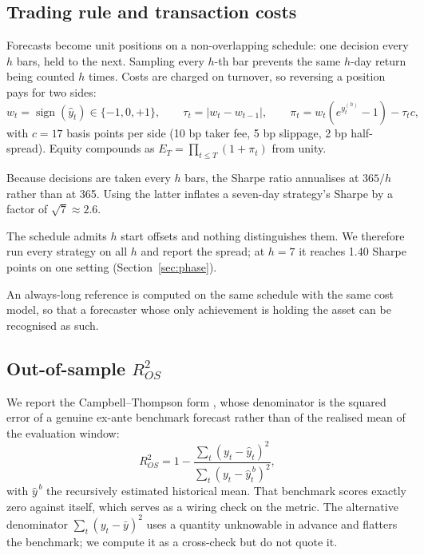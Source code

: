 \documentclass{article}
\theoremstyle{plain}
\theoremstyle{definition}
\newcommand{\rsq}{R^2_{OS}}
\begin{document}
\subsection{Trading rule and transaction costs}
\label{sec:strategy}

Forecasts become unit positions on a non-overlapping schedule: one decision every
$h$ bars, held to the next. Sampling every $h$-th bar prevents the same $h$-day
return being counted $h$ times. Costs are charged on turnover, so reversing a
position pays for two sides:
%
\begin{equation}
  w_t = \operatorname{sign}(\hat{y}_t) \in \{-1, 0, +1\},
  \qquad
  \tau_t = |w_t - w_{t-1}|,
  \qquad
  \pi_t = w_t\!\left(e^{y_t^{(h)}} - 1\right) - \tau_t c,
\end{equation}
%
with $c = 17$ basis points per side (10 bp taker fee, 5 bp slippage, 2 bp
half-spread). Equity compounds as $E_T = \prod_{t \le T}(1 + \pi_t)$ from unity.

Because decisions are taken every $h$ bars, the Sharpe ratio annualises at $365/h$
rather than at 365. Using the latter inflates a seven-day strategy's Sharpe by a
factor of $\sqrt{7} \approx 2.6$.

The schedule admits $h$ start offsets and nothing distinguishes them. We therefore
run every strategy on all $h$ and report the spread; at $h=7$ it reaches 1.40
Sharpe points on one setting (Section~\ref{sec:phase}).

An always-long reference is computed on the same schedule with the same cost
model, so that a forecaster whose only achievement is holding the asset can be
recognised as such.

\subsection{Out-of-sample $\rsq$}
\label{sec:r2}

We report the Campbell--Thompson form \citep{campbell2008}, whose denominator is
the squared error of a genuine ex-ante benchmark forecast rather than of the
realised mean of the evaluation window:
%
\begin{equation}
  \rsq = 1 - \frac{\sum_t (y_t - \hat{y}_t)^2}{\sum_t (y_t - \hat{y}^{\,b}_t)^2},
\end{equation}
%
with $\hat{y}^{\,b}$ the recursively estimated historical mean. That benchmark
scores exactly zero against itself, which serves as a wiring check on the metric.
The alternative denominator $\sum_t (y_t - \bar{y})^2$ uses a quantity unknowable
in advance and flatters the benchmark; we compute it as a cross-check but do not
quote it.
\end{document}
